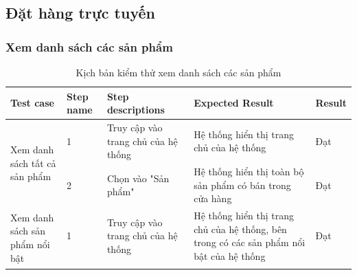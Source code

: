 \subsection{Đặt hàng trực tuyến}

\subsubsection{Xem danh sách các sản phẩm}
{
    \setlength\extrarowheight{6pt}
    \begin{longtable}{| p{2.5cm}| p{1cm}| p{5.5cm}| p{4.5cm} | p{1.5cm} |}
        \hline
        \textbf{Test case}                                                                       & \textbf{Step name} & \textbf{Step descriptions} & \textbf{Expected Result} & \textbf{Result} \\
        \hline
        \multirow[t]{2}{2.5cm}{Xem danh sách tất cả sản phẩm}                                    &
        1                                                                                        &
        Truy cập vào trang chủ của hệ thống                                                      &
        Hệ thống hiển thị trang chủ của hệ thống                                                 &
        Đạt                                                                                                                                                                                     \\
        \cline{2-5}
                                                                                                 & 2                  &
        Chọn vào "Sản phẩm"                                                                      &
        Hệ thống hiển thị toàn bộ sản phẩm có bán trong cửa hàng                                 &
        Đạt                                                                                                                                                                                     \\
        \hline
        \multirow[t]{2}{2.5cm}{Xem danh sách sản phẩm nổi bật}                                   &
        1                                                                                        &
        Truy cập vào trang chủ của hệ thống                                                      &
        Hệ thống hiển thị trang chủ của hệ thống, bên trong có các sản phẩm nổi bật của hệ thống &
        Đạt                                                                                                                                                                                     \\
        \hline
        \caption{Kịch bản kiểm thử xem danh sách các sản phẩm}
    \end{longtable}
}

